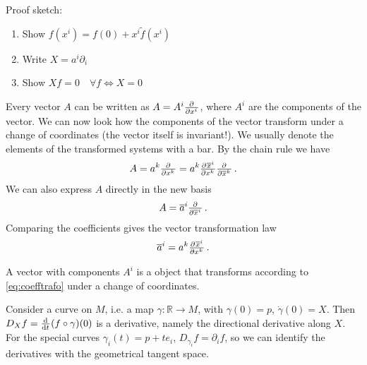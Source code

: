 Proof sketch:
\begin{enumerate}
    \item Show $f(x^i)=f(0)+x^i\tilde{f}(x^i)$
    \item Write $X=a^i\partial_i$
    \item Show $Xf=0\quad \forall f \iff X=0$
\end{enumerate}
Every vector $A$ can be written as $A=A^i\pd{}{{x^i}}$, where $A^i$ are the
components of the vector. We can now look how the components of the vector
transform under a change of coordinates (the vector itself is invariant!). 
We usually denote the elements of the transformed systems with a bar.
By the chain rule we have
\begin{equation}
    A= a^k\pd{}{{x^k}}= a^k\pd{\overline{x}^i}{{x^k}}\pd{}{{\overline{x}^k}}\, .
\end{equation}
We can also express $A$ directly in the new basis
\begin{equation}
    A= \overline{a}^i\pd{}{{\overline{x}^i}}\, .
\end{equation}
Comparing the coefficients gives the vector transformation law
\begin{equation}
    \overline{a}^i=a^k\pd{\overline{x}^i}{{x^k}}\label{eq:coefftrafo}\, .
\end{equation}
\begin{definition} A vector with components $A^i$ is a object that transforms according
to \ref{eq:coefftrafo} under a change of coordinates.
\end{definition}
Consider a curve on $M$, i.e. a map $\gamma:\mathbb{R}\to M$, with
$\gamma(0)=p$, $\dot{\gamma}(0)=X$. Then $D_X f=\od{}{t}(f\circ\gamma)(0)$ is
a derivative, namely the directional derivative along $X$.
For the special curves $\gamma_i(t)=p+te_i$, 
$D_{\dot{\gamma}_i} f=\partial_if$, so we can identify the derivatives with
the geometrical tangent space.


